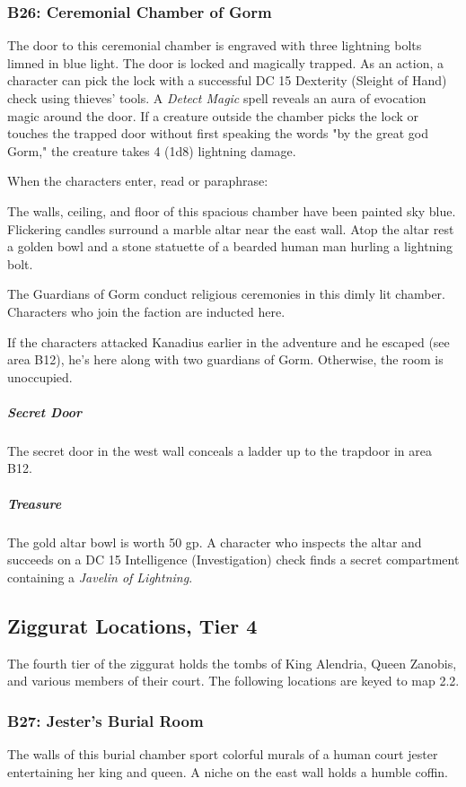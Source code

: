 \documentclass[10pt,a4paper,twoside,bg=print,twocolumn,openany,nodeprecatedcode]{dndbook}
\begin{document}
\subsubsection{B26: Ceremonial Chamber of Gorm}
The door to this ceremonial chamber is engraved with three lightning bolts limned in blue light. The door is locked and magically trapped. As an action, a character can pick the lock with a successful DC 15 Dexterity (Sleight of Hand) check using thieves' tools. A \textit{Detect Magic} spell reveals an aura of evocation magic around the door. If a creature outside the chamber picks the lock or touches the trapped door without first speaking the words "by the great god Gorm," the creature takes 4 (1d8) lightning damage.

When the characters enter, read or paraphrase:

\begin{DndReadAloud}{}
The walls, ceiling, and floor of this spacious chamber have been painted sky blue. Flickering candles surround a marble altar near the east wall. Atop the altar rest a golden bowl and a stone statuette of a bearded human man hurling a lightning bolt.

\end{DndReadAloud}

The Guardians of Gorm conduct religious ceremonies in this dimly lit chamber. Characters who join the faction are inducted here.

If the characters attacked Kanadius earlier in the adventure and he escaped (see area B12), he's here along with two guardians of Gorm. Otherwise, the room is unoccupied.

\subparagraph{Secret Door}
The secret door in the west wall conceals a ladder up to the trapdoor in area B12.

\subparagraph{Treasure}
The gold altar bowl is worth 50 gp. A character who inspects the altar and succeeds on a DC 15 Intelligence (Investigation) check finds a secret compartment containing a \textit{Javelin of Lightning}.

\subsection{Ziggurat Locations, Tier 4}
The fourth tier of the ziggurat holds the tombs of King Alendria, Queen Zanobis, and various members of their court. The following locations are keyed to map 2.2.

\subsubsection{B27: Jester's Burial Room}
\begin{DndReadAloud}{}
The walls of this burial chamber sport colorful murals of a human court jester entertaining her king and queen. A niche on the east wall holds a humble coffin.

\end{DndReadAloud}
\end{document}
